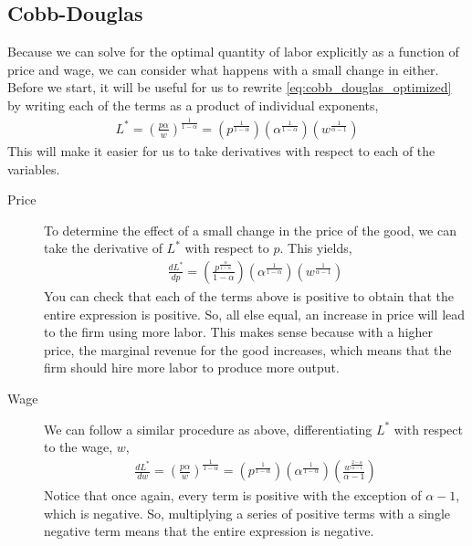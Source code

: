 \subsection*{Cobb-Douglas}
Because we can solve for the optimal quantity of labor explicitly as a function of price and wage, we can consider what happens with a small change in either. Before we start, it will be useful for us to rewrite \ref{eq:cobb_douglas_optimized} by writing each of the terms as a product of individual exponents,
\begin{align}
    L^* = \left(\frac{p \alpha}{w}\right)^{\frac{1}{1 - \alpha}} = \left(p^{\frac{1}{1 - \alpha}}\right) \left(\alpha^{\frac{1}{1 - \alpha}}\right) \left(w^{\frac{1}{\alpha - 1}}\right) \label{eq:cobb_douglas_optimized_simple}
\end{align}
This will make it easier for us to take derivatives with respect to each of the variables. 
\begin{description}
    \item[Price] To determine the effect of a small change in the price of the good, we can take the derivative of $L^*$ with respect to $p$. This yields,
    \begin{align*}
        \frac{dL^*}{dp} = \left(\frac{p^{\frac{\alpha}{1 - \alpha}}}{1 - \alpha}\right)\left(\alpha^{\frac{1}{1 - \alpha}}\right) \left(w^{\frac{1}{\alpha - 1}}\right)
    \end{align*}
    You can check that each of the terms above is positive to obtain that the entire expression is positive. So, all else equal, an increase in price will lead to the firm using more labor. This makes sense because with a higher price, the marginal revenue for the good increases, which means that the firm should hire more labor to produce more output. 
    \item[Wage] We can follow a similar procedure as above, differentiating $L^*$ with respect to the wage, $w$,
    \begin{align*}
        \frac{dL^*}{dw} = \left(\frac{p \alpha}{w}\right)^{\frac{1}{1 - \alpha}} = \left(p^{\frac{1}{1 - \alpha}}\right) \left(\alpha^{\frac{1}{1 - \alpha}}\right) \left(\frac{w^{\frac{2 - \alpha}{\alpha - 1}}}{\alpha - 1}\right)
    \end{align*}
    Notice that once again, every term is positive with the exception of $\alpha - 1$, which is negative. So, multiplying a series of positive terms with a single negative term means that the entire expression is negative.
\end{description}

